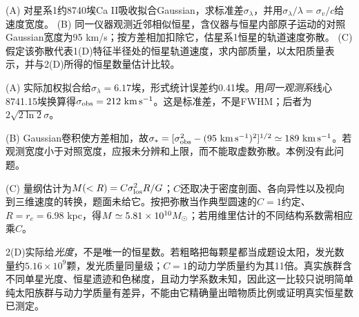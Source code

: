 \begin{exercise}
(A) 对星系1约8740埃Ca II吸收拟合Gaussian，求标准差$\sigma_\lambda$，并用$\sigma_\lambda/\lambda=\sigma_v/c$给速度宽度。
(B) 同一仪器观测近邻相似恒星，含仪器与恒星内部原子运动的对照Gaussian宽度为95 km/s；按方差相加扣除它，估星系1恒星的轨道速度弥散。
(C) 假定该弥散代表1(D)特征半径处的恒星轨道速度，求内部质量，以太阳质量表示，并与2(D)所得的恒星数量估计比较。
\end{exercise}
\begin{solution}
(A) 实际加权拟合给$\sigma_\lambda=6.17$埃，形式统计误差约0.41埃。用\emph{同一观测系}线心8741.15埃换算得$\sigma_{ \rm obs}=212\ \mathrm{km\,s^{-1}}$。这是标准差，不是FWHM；后者为$2\sqrt{2\ln2}\sigma$。
\begin{center}\end{center}
(B) Gaussian卷积使方差相加，故$\sigma_*=[\sigma_{ \rm obs}^2-(95\ \mathrm{km\,s^{-1}})^2]^{1/2}\simeq189\ \mathrm{km\,s^{-1}}$。若观测宽度小于对照宽度，应报未分辨和上限，而不能取虚数弥散。本例没有此问题。

(C) 量纲估计为$M(<R)=C\sigma_{ \rm los}^2R/G$；$C$还取决于密度剖面、各向异性以及视向到三维速度的转换，题面未给它。按把弥散当作典型圆速的$C=1$约定、$R=r_e=6.98$ kpc，得$M\simeq5.81\times10^{10}M_{\odot}$；若用维里估计的不同结构系数需相应乘$C$。

2(D)实际给\emph{光度}，不是唯一的恒星数。若粗略把每颗星都当成题设太阳，发光数量约$5.16\times10^9$颗，发光质量同量级；$C=1$的动力学质量约为其11倍。真实族群含不同单星光度、恒星遗迹和色梯度，且动力学系数未知，因此这一比较只说明简单纯太阳族群与动力学质量有差异，不能由它精确量出暗物质比例或证明真实恒星数已测定。
\end{solution}
